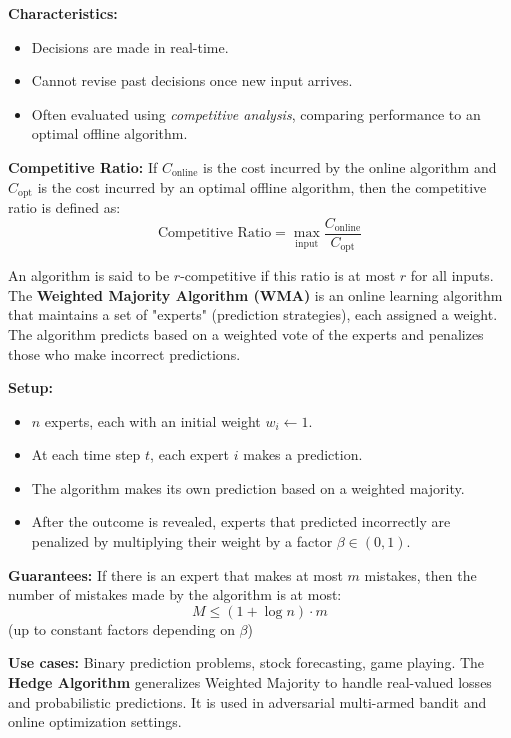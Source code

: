 \documentclass[a4paper,landscape]{article}
\begin{document}
\begin{multicols}{7}
\textbf{Characteristics:}
\begin{itemize}[noitemsep, topsep=0pt]
    \item Decisions are made in real-time.
    \item Cannot revise past decisions once new input arrives.
    \item Often evaluated using \textit{competitive analysis}, comparing performance to an optimal offline algorithm.
\end{itemize}
\textbf{Competitive Ratio:}  
If $C_{\text{online}}$ is the cost incurred by the online algorithm and $C_{\text{opt}}$ is the cost incurred by an optimal offline algorithm, then the competitive ratio is defined as:
\[
\text{Competitive Ratio} = \max_{\text{input}} \frac{C_{\text{online}}}{C_{\text{opt}}}
\]

An algorithm is said to be $r$-competitive if this ratio is at most $r$ for all inputs.
\endtcolorbox
\tcolorbox[mybox={Weighted Majority Algorithm}]
The \textbf{Weighted Majority Algorithm (WMA)} is an online learning algorithm that maintains a set of "experts" (prediction strategies), each assigned a weight. The algorithm predicts based on a weighted vote of the experts and penalizes those who make incorrect predictions.


\textbf{Setup:}
\begin{itemize}[noitemsep, topsep=0pt]
    \item $n$ experts, each with an initial weight $w_i \gets 1$.
    \item At each time step $t$, each expert $i$ makes a prediction.
    \item The algorithm makes its own prediction based on a weighted majority.
    \item After the outcome is revealed, experts that predicted incorrectly are penalized by multiplying their weight by a factor $\beta \in (0, 1)$.
\end{itemize}


\textbf{Guarantees:}  
If there is an expert that makes at most $m$ mistakes, then the number of mistakes made by the algorithm is at most:
\[
M \leq (1 + \log n) \cdot m
\]
(up to constant factors depending on $\beta$)


\textbf{Use cases:} Binary prediction problems, stock forecasting, game playing.
\endtcolorbox
\tcolorbox[mybox={Hedge Algorithm}]
The \textbf{Hedge Algorithm} generalizes Weighted Majority to handle real-valued losses and probabilistic predictions. It is used in adversarial multi-armed bandit and online optimization settings.



\end{multicols}
\end{document}
